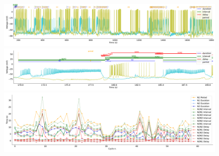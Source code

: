 \begin{figure}[htbp]
	\centering
	\begin{minipage}[b]{\textwidth}
		\centering
		\includegraphics[width=\textwidth,height=0.1\textheight]{./invariants/data/SUSSEX/prep3/images/prep3_3phases_signal_intervals_zoom.pdf}
		\includegraphics[width=\textwidth]{./invariants/data/SUSSEX/prep3/images/prep3_3phases_signal_intervals_cycle.pdf}
		\includegraphics[width=\textwidth]{./invariants/data/SUSSEX/prep3/images/prep3_3phases_time_cycle.pdf}
	\end{minipage}
	\centering
	\begin{minipage}[b]{0.45\textwidth}
		\centering

\end{minipage}
\end{figure}

